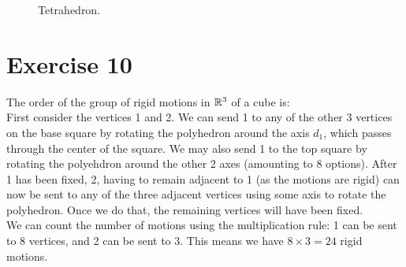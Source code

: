 \documentclass[12pt]{article}
\begin{document}
\begin{figure}[H]

        \caption{\label{fig:figure1} Tetrahedron.}
    \end{figure}


    \section*{Exercise 10}
    The order of the group of rigid motions in $\mathbb{R}^3$ of a cube is: \\
    First consider the vertices 1 and 2.
    We can send 1 to any of the other 3 vertices on the base square by
    rotating the polyhedron around the axis $d_1$, which passes through
    the center of the square. We may also send 1 to the top square by
    rotating the polyehdron around the other 2 axes (amounting to 8 options).
    After 1 has been fixed, 2, having to remain adjacent to 1 (as the
    motions are rigid) can now be sent to any of the three adjacent vertices
    using some axis to rotate the polyhedron. Once we do that, the
    remaining vertices will have been fixed. \\
    We can count the number of motions using the multiplication rule:
    1 can be sent to 8 vertices, and 2 can be sent to 3. This means we
    have $8 \times 3 = 24$ rigid motions. 
\end{document}
